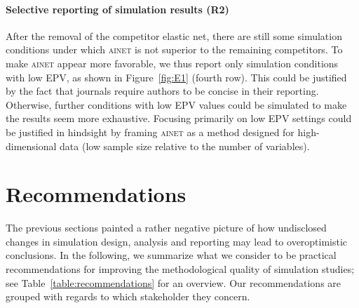 \documentclass[a4paper, 11pt]{article}
\newcommand{\ainet}{\textsc{ainet}}
\begin{document}
\paragraph{Selective reporting of simulation results (R2)}
After the removal of the competitor elastic net, there are still some simulation
conditions under which \ainet{} is not superior to the remaining competitors. To
make \ainet{} appear more favorable, we thus report only simulation conditions
with low EPV, as shown in Figure~\ref{fig:E1} (fourth row). This could be
justified by the fact that journals require authors to be concise in their
reporting. Otherwise, further conditions with low EPV values could be simulated
to make the results seem more exhaustive. Focusing primarily on low EPV settings
could be justified in hindsight by framing \ainet{} as a method designed for
high-dimensional data (low sample size relative to the number of variables).

\section{Recommendations}
\label{sec:recommendations}

The previous sections painted a rather negative picture of how undisclosed
changes in simulation design, analysis and reporting may lead to overoptimistic
conclusions. In the following, we summarize what we consider to be practical
recommendations for improving the methodological quality of simulation studies;
see Table~\ref{table:recommendations} for an overview. Our recommendations are
grouped with regards to which stakeholder they concern.
\end{document}
